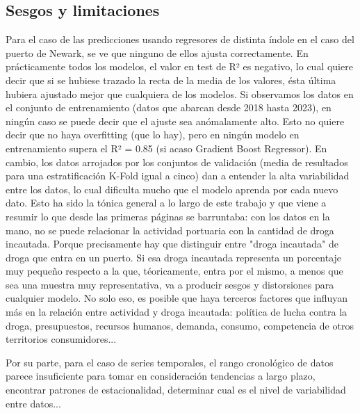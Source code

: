 \documentclass[12pt]{article}
\begin{document}
	\subsection{\label{sesgos}Sesgos y limitaciones}
	Para el caso de las predicciones usando regresores de distinta índole en el caso del puerto de Newark, se ve que ninguno de ellos ajusta correctamente. En prácticamente todos los modelos, el valor en test de R² es negativo, lo cual quiere decir que si se hubiese trazado la recta de la media de los valores, ésta última hubiera ajustado mejor que cualquiera de los modelos. Si observamos los datos en el conjunto de entrenamiento (datos que abarcan desde 2018 hasta 2023), en ningún caso se puede decir que el ajuste sea anómalamente alto. Esto no quiere decir que no haya overfitting (que lo hay), pero en ningún modelo en entrenamiento supera el R² = 0.85 (si acaso Gradient Boost Regressor). En cambio, los datos arrojados por los conjuntos de validación (media de resultados para una estratificación K-Fold igual a cinco) dan a entender la alta variabilidad entre los datos, lo cual dificulta mucho que el modelo aprenda por cada nuevo dato. Esto ha sido la tónica general a lo largo de este trabajo y que viene a resumir lo que desde las primeras páginas se barruntaba: con los datos en la mano, no se puede relacionar la actividad portuaria con la cantidad de droga incautada. Porque precisamente hay que distinguir entre "droga incautada" de droga que entra en un puerto. Si esa droga incautada representa un porcentaje muy pequeño respecto a la que, téoricamente, entra por el mismo, a menos que sea una muestra muy representativa, va a producir sesgos y distorsiones para cualquier modelo. No solo eso, es posible que haya terceros factores que influyan más en la relación entre actividad y droga incautada: política de lucha contra la droga, presupuestos, recursos humanos, demanda, consumo, competencia de otros territorios consumidores...
	
	Por su parte, para el caso de series temporales, el rango cronológico de datos parece insuficiente para tomar en consideración tendencias a largo plazo, encontrar patrones de estacionalidad, determinar cual es el nivel de variabilidad entre datos... 

\newpage
\end{document}
